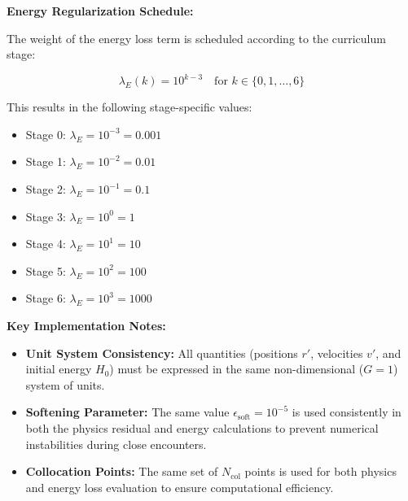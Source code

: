 \textbf{Energy Regularization Schedule:}

The weight of the energy loss term is scheduled according to the curriculum stage:

\[
\lambda_E(k) = 10^{k-3} \quad \text{for } k \in \{0, 1, \ldots, 6\}
\]

This results in the following stage-specific values:
\begin{itemize}
    \item Stage 0: $\lambda_E = 10^{-3} = 0.001$
    \item Stage 1: $\lambda_E = 10^{-2} = 0.01$
    \item Stage 2: $\lambda_E = 10^{-1} = 0.1$
    \item Stage 3: $\lambda_E = 10^{0} = 1$
    \item Stage 4: $\lambda_E = 10^{1} = 10$
    \item Stage 5: $\lambda_E = 10^{2} = 100$
    \item Stage 6: $\lambda_E = 10^{3} = 1000$
\end{itemize}

\textbf{Key Implementation Notes:}
\begin{itemize}
    \item \textbf{Unit System Consistency:} All quantities (positions $r'$, velocities $v'$, and initial energy $H_0$) must be expressed in the same non-dimensional ($G = 1$) system of units.
    \item \textbf{Softening Parameter:} The same value $\epsilon_{\text{soft}} = 10^{-5}$ is used consistently in both the physics residual and energy calculations to prevent numerical instabilities during close encounters.
    \item \textbf{Collocation Points:} The same set of $N_{\text{col}}$ points is used for both physics and energy loss evaluation to ensure computational efficiency.
\end{itemize}
